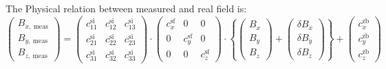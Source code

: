 The Physical relation between measured and real field is:
\begin{equation}
    \begin{pmatrix}
    B_{x,\ \mathrm{meas}} \\
    B_{y,\ \mathrm{meas}} \\
    B_{z,\ \mathrm{meas}}
    \end{pmatrix}
    =
    \begin{pmatrix}
        c^\mathrm{si}_{11} & c^\mathrm{si}_{12} & c^\mathrm{si}_{13} \\
        c^\mathrm{si}_{21} & c^\mathrm{si}_{22} & c^\mathrm{si}_{23} \\
        c^\mathrm{si}_{31} & c^\mathrm{si}_{32} & c^\mathrm{si}_{33} 
    \end{pmatrix}
    \cdot
    \begin{pmatrix}
        c^\mathrm{sf}_x & 0 & 0 \\
        0 & c^\mathrm{sf}_y & 0 \\
        0 & 0 & c^\mathrm{sf}_z
    \end{pmatrix}
    \cdot \left\{
    \begin{pmatrix}
    B_x \\ B_y \\ B_z
    \end{pmatrix}
    +\begin{pmatrix}
     \delta B_x \\
     \delta B_y \\
     \delta B_z   
    \end{pmatrix} 
    \right\}
    +\begin{pmatrix}
        c^{\mathrm{zb}}_x \\
        c^{\mathrm{zb}}_y \\
        c^{\mathrm{zb}}_z 
    \end{pmatrix}
\end{equation}

